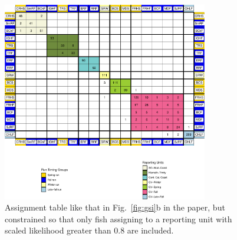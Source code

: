 \begin{figure}
\begin{center}
\includegraphics[width=0.8\textwidth]{images/ass-table-80-crop.pdf}
\end{center}
\caption[Assignment table for fish with scaled likelihood $ > 0.8$]{\footnotesize Assignment table
like that in Fig.~\ref{fig:gsi}b in the paper, but constrained so that only fish assigning
to a reporting unit with scaled likelihood greater than 0.8 are included.}
\label{fig:eighty}
\end{figure}





